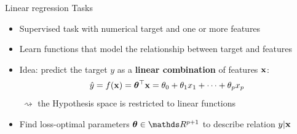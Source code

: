 \documentclass[11pt,compress,t,notes=noshow, xcolor=table]{beamer}
\begin{document}
\begin{vbframe}{Linear regression Tasks}

\begin{itemize}
    \item Supervised task with numerical target and one or more features
    \item Learn functions that model the relationship between target and features
    
    \item Idea: predict the target $y$ as a \textbf{linear combination} of 
    features $\mathbf{x}$:
    $$\hat{y} = f(\mathbf{x}) = \bm{\theta}^\top \mathbf{x} = \theta_0 + \theta_1 x_1 + \dots + \theta_p x_p$$
    $~\rightsquigarrow$ the Hypothesis space is restricted to linear functions
    \item Find loss-optimal parameters $\thetab \in \R^{p+1}$ to describe relation 
    $y | \mathbf{x}$
    

\end{itemize}
\end{vbframe}
\end{document}
